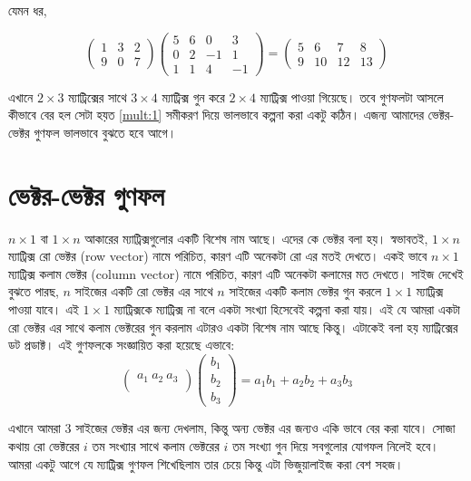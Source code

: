 যেমন ধর,

$$
\begin{pmatrix}
1 & 3 & 2\\
9 & 0 & 7
\end{pmatrix}
\begin{pmatrix}
5 & 6 & 0 & 3 \\
0 & 2 & -1 & 1\\
1 & 1 & 4 & -1
\end{pmatrix} =
\begin{pmatrix}
5 & 6 & 7 & 8\\
9 & 10 & 12 & 13
\end{pmatrix}
$$

\noindent এখানে $2 \times 3$ ম্যাট্রিক্সের সাথে $3 \times 4$ ম্যাট্রিক্স গুন করে $2 \times 4$ ম্যাট্রিক্স পাওয়া গিয়েছে। তবে গুণফলটা আসলে কীভাবে বের হল সেটা হয়ত \eqref{mult:1} সমীকরণ দিয়ে ভালভাবে কল্পনা করা একটু কঠিন। এজন্য আমাদের ভেক্টর-ভেক্টর গুণফল ভালভাবে বুঝতে হবে আগে।

\section{ভেক্টর-ভেক্টর গুণফল}
\noindent $n \times 1$ বা $1 \times n$ আকারের ম্যাট্রিক্সগুলোর একটি বিশেষ নাম আছে। এদের কে ভেক্টর বলা হয়। স্বভাবতই, $1 \times n$ ম্যাট্রিক্স রো ভেক্টর (row vector) নামে পরিচিত, কারণ এটি অনেকটা রো এর মতই দেখতে। একই ভাবে $n \times 1$ ম্যাট্রিক্স কলাম ভেক্টর (column vector) নামে পরিচিত, কারণ এটি অনেকটা কলামের মত দেখতে। সাইজ দেখেই বুঝতে পারছ, $n$ সাইজের একটি রো ভেক্টর এর সাথে $n$ সাইজের একটি কলাম ভেক্টর গুন করলে $1 \times 1$ ম্যাট্রিক্স পাওয়া যাবে। এই $1 \times 1$ ম্যাট্রিক্সকে ম্যাট্রিক্স না বলে একটা সংখ্যা হিসেবেই কল্পনা করা যায়। এই যে আমরা একটা রো ভেক্টর এর সাথে কলাম ভেক্টরের গুন করলাম এটারও একটা বিশেষ নাম আছে কিন্তু। এটাকেই বলা হয় ম্যাট্রিক্সের ডট প্রডাক্ট। এই গুণফলকে সংজ্ঞায়িত করা হয়েছে এভাবে:
$$
\begin{pmatrix}
a_1 \ a_2 \ a_3\\
\end{pmatrix}
\begin{pmatrix}
b_1 \\
b_2 \\
b_3
\end{pmatrix} =
a_1 b_1 + a_2 b_2 + a_3 b_3
$$

\noindent এখানে আমরা $3$ সাইজের ভেক্টর এর জন্য দেখলাম, কিন্তু অন্য ভেক্টর এর জন্যও একি ভাবে বের করা যাবে। সোজা কথায় রো ভেক্টরের $i$ তম সংখ্যার সাথে কলাম ভেক্টরের $i$ তম সংখ্যা গুন দিয়ে সবগুলোর যোগফল নিলেই হবে। আমরা একটু আগে যে ম্যাট্রিক্স গুণফল শিখেছিলাম তার চেয়ে কিন্তু এটা ভিজুয়ালাইজ করা বেশ সহজ।

